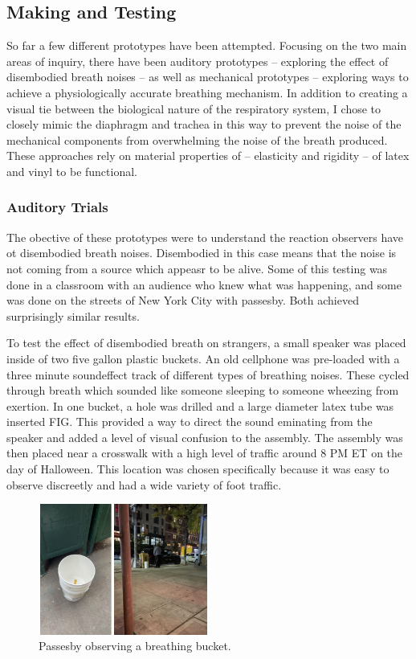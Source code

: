\documentclass[letterpaper]{article}
\begin{document}
\subsection{Making and Testing}

So far a few different prototypes have been attempted. Focusing on the two main areas of inquiry, there have been auditory prototypes -- exploring the effect of disembodied breath noises -- as well as mechanical prototypes -- exploring ways to achieve a physiologically accurate breathing mechanism. In addition to creating a visual tie between the biological nature of the respiratory system, I chose to closely mimic the diaphragm and trachea in this way to prevent the noise of the mechanical components from overwhelming the noise of the breath produced. These approaches rely on material properties of -- elasticity and rigidity -- of latex and vinyl to be functional.

\subsubsection{Auditory Trials}

The obective of these prototypes were to understand the reaction observers have ot disembodied breath noises. Disembodied in this case means that the noise is not coming from a source which appeasr to be alive. Some of this testing was done in a classroom with an audience who knew what was happening, and some was done on the streets of New York City with passesby. Both achieved surprisingly similar results. 

To test the effect of disembodied breath on strangers, a small speaker was placed inside of two five gallon plastic buckets. An old cellphone was pre-loaded with a three minute soundeffect track of different types of breathing noises. These cycled through breath which sounded like someone sleeping to someone wheezing from exertion. In one bucket, a hole was drilled and a large diameter latex tube was inserted FIG. This provided a way to direct the sound eminating from the speaker and added a level of visual confusion to the assembly. The assembly was then placed near a crosswalk with a high level of traffic around 8 PM ET on the day of Halloween. This location was chosen specifically because it was easy to observe discreetly and had a wide variety of foot traffic. 

\begin{figure}[h]
\includegraphics[width=0.5\textwidth]{images/buckettest.png}
\caption{Passesby observing a breathing bucket.}
\end{figure}
\end{document}
